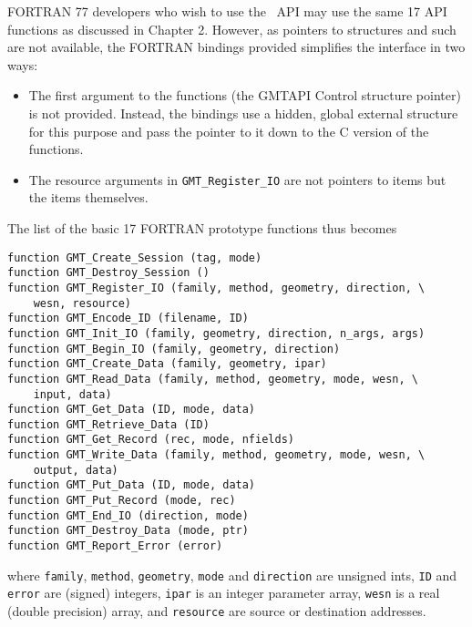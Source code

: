 \documentclass[11pt]{report}
\begin{document}
FORTRAN 77 developers who wish to use the \GMT\ API may use the same 17 API functions as discussed in Chapter 2.
However, as pointers to structures and such are not available, the FORTRAN bindings provided simplifies the
interface in two ways:
\begin{itemize}
\item The first argument to the functions (the GMTAPI Control structure pointer) is not provided.  Instead,
the bindings use a hidden, global external structure for this purpose and pass the pointer to it down to
the C version of the functions.
\item The resource arguments in \texttt{GMT\_Register\_IO} are not pointers to
items but the items themselves.
\end{itemize}
The list of the basic 17 FORTRAN prototype functions thus becomes
\begin{verbatim}
function GMT_Create_Session (tag, mode)
function GMT_Destroy_Session ()
function GMT_Register_IO (family, method, geometry, direction, \
    wesn, resource)
function GMT_Encode_ID (filename, ID)
function GMT_Init_IO (family, geometry, direction, n_args, args)
function GMT_Begin_IO (family, geometry, direction)
function GMT_Create_Data (family, geometry, ipar)
function GMT_Read_Data (family, method, geometry, mode, wesn, \
	input, data)
function GMT_Get_Data (ID, mode, data)
function GMT_Retrieve_Data (ID)
function GMT_Get_Record (rec, mode, nfields)
function GMT_Write_Data (family, method, geometry, mode, wesn, \
	output, data)
function GMT_Put_Data (ID, mode, data)
function GMT_Put_Record (mode, rec)
function GMT_End_IO (direction, mode)
function GMT_Destroy_Data (mode, ptr)
function GMT_Report_Error (error)
\end{verbatim}
where \texttt{family}, \texttt{method}, \texttt{geometry}, \texttt{mode} and \texttt{direction}
are unsigned ints, \texttt{ID} and \texttt{error} are (signed) integers,
\texttt{ipar} is an integer parameter array, \texttt{wesn} is a real (double precision) array,
and \texttt{resource} are source or destination addresses.

\clearpage
\printindex
\end{document}
